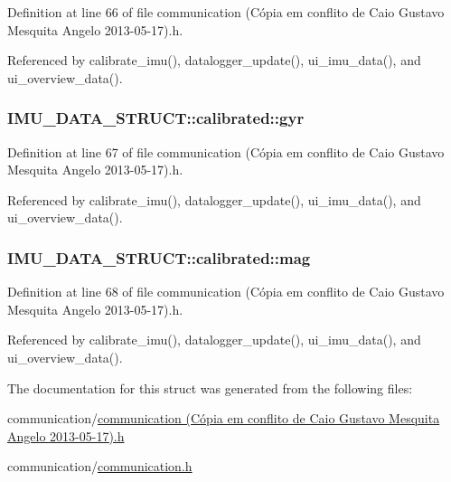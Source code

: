 Definition at line 66 of file communication (\-Cópia em conflito de Caio Gustavo Mesquita Angelo 2013-\/05-\/17).\-h.



Referenced by calibrate\-\_\-imu(), datalogger\-\_\-update(), ui\-\_\-imu\-\_\-data(), and ui\-\_\-overview\-\_\-data().

\hypertarget{structIMU__DATA__STRUCT_1_1calibrated_a8a54aded6ce608f1b7d2b4a0c52c248b}{
\subsubsection[{gyr}]{ I\-M\-U\-\_\-\-D\-A\-T\-A\-\_\-\-S\-T\-R\-U\-C\-T\-::calibrated\-::gyr}}\label{structIMU__DATA__STRUCT_1_1calibrated_a8a54aded6ce608f1b7d2b4a0c52c248b}


Definition at line 67 of file communication (\-Cópia em conflito de Caio Gustavo Mesquita Angelo 2013-\/05-\/17).\-h.



Referenced by calibrate\-\_\-imu(), datalogger\-\_\-update(), ui\-\_\-imu\-\_\-data(), and ui\-\_\-overview\-\_\-data().

\hypertarget{structIMU__DATA__STRUCT_1_1calibrated_a2fde6c6759e0fda17e272c32096cb9ec}{
\subsubsection[{mag}]{ I\-M\-U\-\_\-\-D\-A\-T\-A\-\_\-\-S\-T\-R\-U\-C\-T\-::calibrated\-::mag}}\label{structIMU__DATA__STRUCT_1_1calibrated_a2fde6c6759e0fda17e272c32096cb9ec}


Definition at line 68 of file communication (\-Cópia em conflito de Caio Gustavo Mesquita Angelo 2013-\/05-\/17).\-h.



Referenced by calibrate\-\_\-imu(), datalogger\-\_\-update(), ui\-\_\-imu\-\_\-data(), and ui\-\_\-overview\-\_\-data().



The documentation for this struct was generated from the following files\-:\begin{DoxyCompactItemize}
\item 
communication/\hyperlink{communication_01_07C_xC3_xB3pia_01em_01conflito_01de_01Caio_01Gustavo_01Mesquita_01Angelo_012013-05-17_08_8h}{communication (\-Cópia em conflito de Caio Gustavo Mesquita Angelo 2013-\/05-\/17).\-h}\item 
communication/\hyperlink{communication_2communication_8h}{communication.\-h}\end{DoxyCompactItemize}
